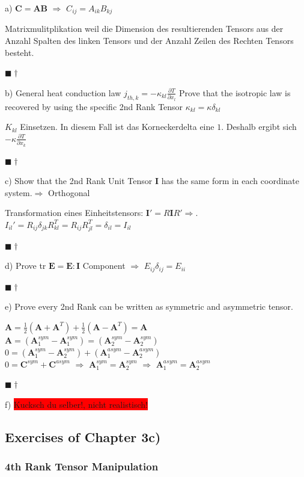 \documentclass[a4paper]{scrartcl}
\newcommand{\qed}{\begin{flushright}
$\blacksquare \dagger$ \end{flushright}}
\begin{document}
a) $\mathbf{C}=\mathbf{AB}$ $\Rightarrow$ $C_{ij}=A_{ik}B_{kj}$

Matrixmulitplikation weil die Dimension des resultierenden Tensors aus der
Anzahl Spalten des linken Tensors und der Anzahl Zeilen des Rechten Tensors
besteht. \qed

b) General heat conduction law $j_{th,k}=-\kappa_{kl}\frac{\partial
T}{\partial x_l}$ Prove that the isotropic law is recovered by using the
specific 2nd Rank Tensor $\kappa_{kl}=\kappa \delta_{kl}$

$K_{kl}$ Einsetzen. In diesem Fall ist das Korneckerdelta eine $1$. Deshalb
ergibt sich $-\kappa \frac{\partial T}{\partial x_k}$ \qed

c) Show that the 2nd Rank Unit Tensor $\mathbf{I}$ has the same form in each
coordinate system.$\Rightarrow$ Orthogonal

Transformation eines Einheitstensors: $\mathbf{I}'=R\mathbf{I}R'\Rightarrow$.
$I_{il}'=R_{ij}\delta_{jk}R_{kl}^T = R_{ij}R_{jl}^T=\delta_{il}=I_{il}$ \qed



d) Prove tr $\mathbf{E}=\mathbf{E : I}$
Component $\Rightarrow$ $E_{ij}\delta_{ij}=E_{ii}$ \qed

e) Prove every 2nd Rank can be written as symmetric and asymmetric tensor.

$\mathbf{A}=\frac{1}{2}\left(\mathbf{A} + \mathbf{A}^T\right)+
\frac{1}{2}\left(\mathbf{A}-\mathbf{A}^T\right) = \mathbf{A}$ \\
$\mathbf{A}=\left(\mathbf{A}_1^{sym}-\mathbf{A}_1^{sym}\right)=\left(\mathbf{A}_2^{sym}-\mathbf{A}_2^{sym}\right)$
\\
$0=\left(\mathbf{A}_1^{sym}-\mathbf{A}_2^{sym}\right)+\left(\mathbf{A}_1^{asym}-\mathbf{A}_2^{asym}\right)$
\\
$0=\mathbf{C}^{sym}+\mathbf{C}^{asym}$ $\Rightarrow$
$\mathbf{A}_1^{sym}=\mathbf{A}_2^{sym}$ $\Rightarrow$
$\mathbf{A}_1^{asym}=\mathbf{A}_2^{asym}$ \qed


f) \colorbox{red}{Kucksch du selber!, nicht realistisch!}




\subsection{Exercises of Chapter 3c)}

\subsubsection{4th Rank Tensor Manipulation}
\end{document}
